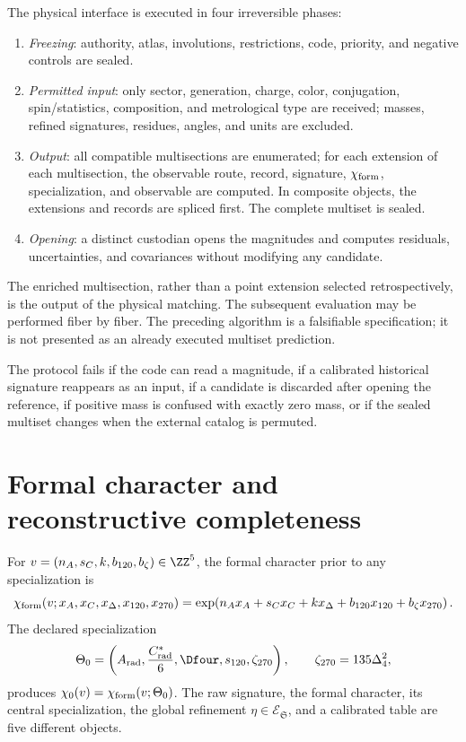\begin{algorithm}
\label{alg:asignacion-futura-sin-magnitudes}
The physical interface is executed in four irreversible phases:
\begin{enumerate}
 \item \emph{Freezing}: authority, atlas, involutions,
restrictions, code, priority, and negative controls are sealed.
 \item \emph{Permitted input}: only sector, generation, charge,
 color, conjugation, spin/statistics, composition, and metrological type are
 received; masses, refined signatures, residues, angles, and units are excluded.
 \item \emph{Output}: all compatible multisections are enumerated; for
 each extension of each multisection, the observable route, record,
 signature, \(\chi_{\rm form}\), specialization, and observable are computed. In composite
 objects, the extensions and records are spliced first. The complete
 multiset is sealed.
 \item \emph{Opening}: a distinct custodian opens the magnitudes and computes
residuals, uncertainties, and covariances without modifying any candidate.
\end{enumerate}
\end{algorithm}

The enriched multisection, rather than a point extension selected
retrospectively, is the output of the physical matching. The subsequent
evaluation may be performed fiber by fiber. The preceding algorithm is a
falsifiable specification; it is not presented as an already executed multiset
prediction.

\begin{criterion}
\label{crit:fallo-protocolo-ciego}
The protocol fails if the code can read a magnitude, if a calibrated
historical signature reappears as an input, if a candidate is discarded after
opening the reference, if positive mass is confused with exactly zero mass,
or if the sealed multiset changes when the external catalog is permuted.
\end{criterion}

\section{Formal character and reconstructive completeness}
\label{sec:completitud-reconstructiva-torres}

For \(v=(n_A,s_C,k,b_{120},b_{\zeta})\in\ZZ^5\), the formal character
prior to any specialization is
\[
 \chi_{\rm form}(v;x_A,x_C,x_\Delta,x_{120},x_{270})
 =\exp\!\left(
 n_Ax_A+s_Cx_C+kx_\Delta
 +b_{120}x_{120}+b_{\zeta}x_{270}\right).
\]
The declared specialization
\[
 \Theta_0
 =\left(A_{\rm rad},\frac{C^\ast_{\rm rad}}6,
 \Dfour,s_{120},\zeta_{270}\right),
 \qquad \zeta_{270}=135\Delta_4^2,
\]
produces
\(\chi_0(v)
=\chi_{\rm form}(v;\Theta_0)\).
The raw signature, the formal character, its central specialization, the
global refinement \(\eta\in\mathcal E_{\mathfrak S}\), and a calibrated
table are five different objects.


